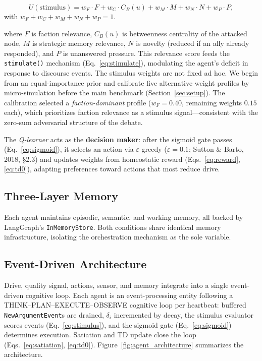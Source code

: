 \documentclass{llncs}
\begin{document}
\begin{equation}
    U(\text{stimulus}) = w_F \cdot F + w_C \cdot C_B(u) + w_M \cdot M
        + w_N \cdot N + w_P \cdot P,
    \label{eq:stimulus}
\end{equation}
with $w_F + w_C + w_M + w_N + w_P = 1$.

\noindent where $F$ is faction relevance, $C_B(u)$ is betweenness
centrality of the attacked node, $M$ is strategic memory relevance, $N$ is
novelty (reduced if an ally already responded), and $P$ is unanswered
pressure. This relevance score feeds the \texttt{stimulate()} mechanism
(Eq.~\ref{eq:stimulate}), modulating the agent's deficit in response to
discourse events. The stimulus weights are not fixed ad hoc.  We begin from an
equal-importance prior and calibrate five alternative weight profiles by
micro-simulation before the main benchmark (Section~\ref{sec:setup}).
The calibration selected a \emph{faction-dominant} profile
($w_F{=}0.40$, remaining weights $0.15$ each), which prioritizes
faction relevance as a stimulus signal---consistent with the zero-sum
adversarial structure of the debate.

The \emph{Q-learner} acts as the \textbf{decision maker}: after the
sigmoid gate passes (Eq.~\ref{eq:sigmoid}), it selects an action via
$\varepsilon$-greedy ($\varepsilon=0.1$; Sutton \& Barto, 2018, \S2.3)
and updates weights from homeostatic reward (Eqs.~\ref{eq:reward},
\ref{eq:td0}), adapting preferences toward actions that most reduce drive.


\subsection{Three-Layer Memory}

Each agent maintains episodic, semantic, and working memory, all backed by
LangGraph's \texttt{InMemoryStore}.  Both conditions share identical memory
infrastructure, isolating the orchestration mechanism as the sole variable.

\subsection{Event-Driven Architecture}

Drive, quality signal, actions, sensor, and memory integrate into a single
event-driven cognitive loop.  Each agent is an event-processing entity following a
THINK--PLAN--EXECUTE--OBSERVE cognitive loop per heartbeat: buffered
\texttt{NewArgumentEvent}s are drained, $\delta_i$ incremented by decay,
the stimulus evaluator scores events (Eq.~\ref{eq:stimulus}), and the
sigmoid gate (Eq.~\ref{eq:sigmoid}) determines execution.  Satiation and
TD update close the loop (Eqs.~\ref{eq:satiation}, \ref{eq:td0}).
Figure~\ref{fig:agent_architecture} summarizes the architecture.
\end{document}
